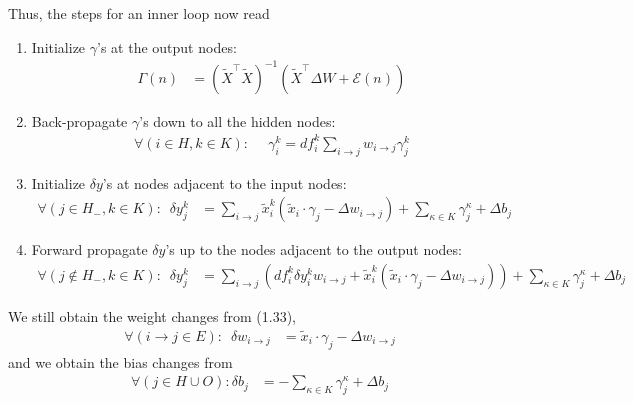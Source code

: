 \documentclass[12pt]{article}
\renewcommand{\ij}{i \rightarrow j}
\begin{document}
Thus, the steps for an inner loop now read
\begin{enumerate}
\item
Initialize $\gamma$'s at the output nodes:
\begin{align}
\Gamma(n) & = (\tilde{X}^\top \tilde{X})^{-1} (\tilde{X}^\top \Delta W + \mathcal{E}(n)) \tag{17}
\end{align}

\item
Back-propagate $\gamma$'s down to all the hidden nodes:
\begin{align}
\forall (i \in H, k \in K): & \,\,\, \gamma_i^k = df_i^k \sum_{i \rightarrow j} w_{i \rightarrow j} \gamma_j^k \tag{4}
\end{align}

\item
Initialize $\delta y$'s at nodes adjacent to the input nodes:
\begin{align}
\forall (j \in H_-, k \in K): \,\,\, \delta y_j^k
& = \sum_{\ij} \tilde{x}_i^k (\tilde{x}_i \cdot \gamma_j - \Delta w_{\ij})
+ \sum_{\kappa \in K} \gamma_j^\kappa + \Delta b_j \tag{9}
\end{align}

\item
Forward propagate $\delta y$'s up to the nodes adjacent to the output nodes:
\begin{align}
\forall (j \not\in H_-, k \in K): \,\,\, \delta y_j^k & = 
\sum_{\ij} (df_i^k \delta y_i^k w_{\ij} + \tilde{x}_i^k (\tilde{x}_i \cdot \gamma_j - \Delta w_{\ij}) ) 
+ \sum_{\kappa \in K} \gamma_j^\kappa + \Delta b_j \tag{11}
\end{align}

\end{enumerate}
We still obtain the weight changes from (1.33),
\begin{align*}
\forall (\ij \in E): \,\,\, \delta w_{\ij} & = \tilde{x}_i \cdot \gamma_j - \Delta w_{\ij}
\end{align*}
and we obtain the bias changes from
\begin{align*}
\forall (j \in H \cup O) : \delta b_j & = -\sum_{\kappa \in K} \gamma_j^\kappa + \Delta b_j
\end{align*}




{}

\end{document}
